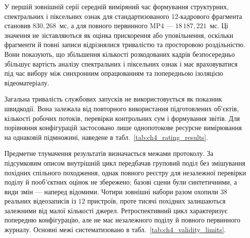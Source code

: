 У першій зовнішній серії середній виміряний час формування структурних, спектральних і піксельних ознак для стандартизованого 12-кадрового фрагмента становив $830{,}268$~мс, а для повного первинного MP4 --- $18\,187{,}221$~мс. Ці значення не зіставляються як оцінка прискорення або уповільнення, оскільки фрагменти й повні записи відрізнялися тривалістю та просторовою роздільністю. Вони показують, що збільшення кількості розкодованих кадрів безпосередньо збільшує вартість аналізу спектральних і піксельних ознак і має враховуватися під час вибору між синхронним опрацюванням та попередньою ізоляцією відеоматеріалу.

Загальна тривалість службових запусків не використовується як показник швидкодії. Вона залежала від повторного використання підготовлених об’єктів, кількості робочих потоків, перевірки контрольних сум і формування звітів. Для порівняння конфігурацій застосовано лише однопотокове ресурсне вимірювання на однаковій підмножині, наведене в табл.~\ref{tab:ch4_rating_results}.

Предметне тлумачення результатів визначається межами протоколу. За підсумковим описом внутрішній цикл передбачав груповий поділ без змішування похідних спільного походження, однак повного реєстру для незалежної перевірки поділу й пооб’єктних оцінок не збережено; базові сцени були синтетичними, а види змін --- наперед відомими. Чотири зовнішні набори разом охопили $38$ реальних відеозаписів із $12$ пристроїв, проте тисячі похідних залишаються залежними від малої кількості джерел. Ретроспективний цикл характеризує попередню конфігурацію, але не має незалежного поділу й повного первинного журналу. Основні межі систематизовано в табл.~\ref{tab:ch4_validity_limits}.

